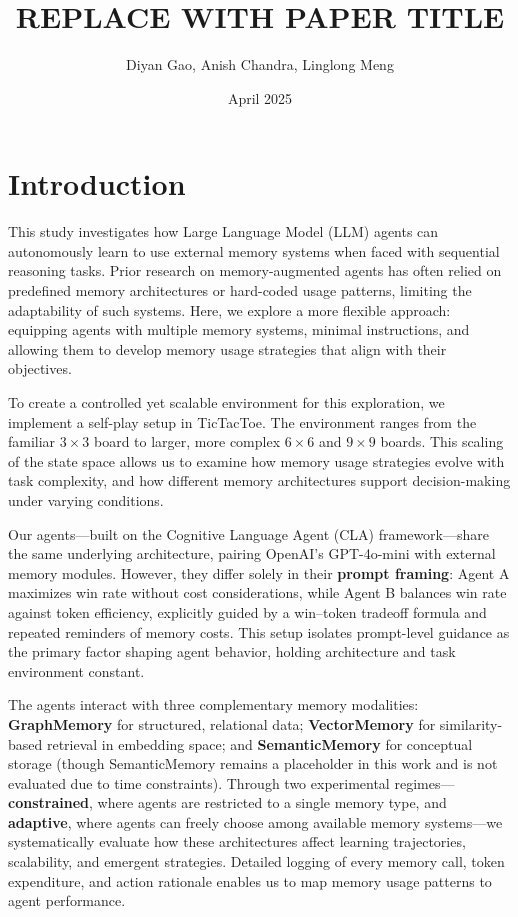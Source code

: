 \documentclass[10pt]{article}
\title{REPLACE WITH PAPER TITLE}
\author{Diyan Gao, Anish Chandra, Linglong Meng}
\date{April 2025}
\begin{document}
\maketitle

\section{Introduction}

This study investigates how Large Language Model (LLM) agents can autonomously learn to use external memory systems when faced with sequential reasoning tasks. Prior research on memory-augmented agents has often relied on predefined memory architectures or hard-coded usage patterns, limiting the adaptability of such systems. Here, we explore a more flexible approach: equipping agents with multiple memory systems, minimal instructions, and allowing them to develop memory usage strategies that align with their objectives.

To create a controlled yet scalable environment for this exploration, we implement a self-play setup in TicTacToe. The environment ranges from the familiar $3 \times 3$ board to larger, more complex $6 \times 6$ and $9 \times 9$ boards. This scaling of the state space allows us to examine how memory usage strategies evolve with task complexity, and how different memory architectures support decision-making under varying conditions.

Our agents—built on the Cognitive Language Agent (CLA) framework—share the same underlying architecture, pairing OpenAI's GPT-4o-mini with external memory modules. However, they differ solely in their \textbf{prompt framing}: Agent A maximizes win rate without cost considerations, while Agent B balances win rate against token efficiency, explicitly guided by a win–token tradeoff formula and repeated reminders of memory costs. This setup isolates prompt-level guidance as the primary factor shaping agent behavior, holding architecture and task environment constant.

The agents interact with three complementary memory modalities: \textbf{GraphMemory} for structured, relational data; \textbf{VectorMemory} for similarity-based retrieval in embedding space; and \textbf{SemanticMemory} for conceptual storage (though SemanticMemory remains a placeholder in this work and is not evaluated due to time constraints). Through two experimental regimes—\textbf{constrained}, where agents are restricted to a single memory type, and \textbf{adaptive}, where agents can freely choose among available memory systems—we systematically evaluate how these architectures affect learning trajectories, scalability, and emergent strategies. Detailed logging of every memory call, token expenditure, and action rationale enables us to map memory usage patterns to agent performance.
\end{document}
